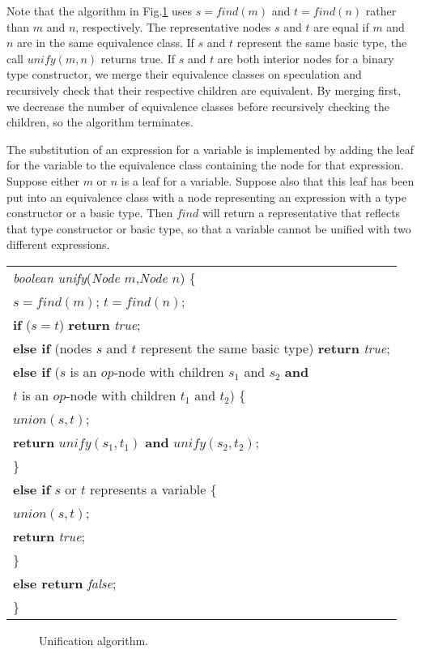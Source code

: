 \documentclass[12pt,a4paper,twoside,openany]{book}
\begin{document}
{    Note that the algorithm in Fig.\;\ref{Fig:6.32} uses $s=find(m)$ and $t=find(n)$ rather than $m$ and $n$, respectively. The representative nodes $s$ and $t$ are equal if $m$ and $n$ are in the same equivalence class. If $s$ and $t$ represent the same basic type, the call $unify(m,n)$ returns true. If $s$ and $t$ are both interior nodes for a binary type constructor, we merge their equivalence classes on speculation and recursively check that their respective children are equivalent. By merging first, we decrease the number of equivalence classes before recursively checking the children, so the algorithm terminates.

    The substitution of an expression for a variable is implemented by adding the leaf for the variable to the equivalence class containing the node for that expression. Suppose either $m$ or $n$ is a leaf for a variable. Suppose also that this leaf has been put into an equivalence class with a node representing an expression with a type constructor or a basic type. Then $find$ will return a representative that reflects that type constructor or basic type, so that a variable cannot be unified with two different expressions.
}

\begin{center}
    \begin{tabular}{l}
        \textit{boolean unify}(\textit{Node $m$},\textit{Node $n$}) \{\\
        \qquad $s=find(m)$; $t=find(n)$;\\
        \qquad \textbf{if} ($s=t$) \textbf{return} \textit{true};\\
        \qquad \textbf{else if} (nodes $s$ and $t$ represent the same basic type) \textbf{return} \textit{true};\\
        \qquad \textbf{else if} ($s$ is an $op$-node with children $s_1$ and $s_2$ \textbf{and}\\
        \qquad\qquad\qquad $t$ is an $op$-node with children $t_1$ and $t_2$) \{\\
        \qquad\qquad $union(s,t)$;\\
        \qquad\qquad \textbf{return} $unify(s_1,t_1)$ \textbf{and} $unify(s_2,t_2)$;\\
        \qquad \}\\
        \qquad \textbf{else if} $s$ or $t$ represents a variable \{\\
        \qquad\qquad $union(s,t)$;\\
        \qquad\qquad \textbf{return} \textit{true};\\
        \qquad \}\\
        \qquad \textbf{else return} \textit{false};\\
        \} 
    \end{tabular}
\end{center}
\begin{figure}[htbp]
    \caption{Unification algorithm.}
    \label{Fig:6.32}
\end{figure}
\end{document}

